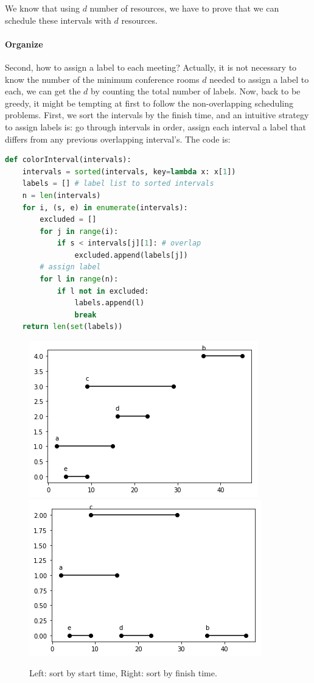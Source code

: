 \documentclass[../main.tex]{subfiles}
\begin{document}
We know that using $d$ number of resources, we have to prove that we can schedule these intervals with $d$ resources. 

\paragraph{Organize}

Second, how to assign a label to each meeting? Actually, it is not necessary to know the number of the minimum conference rooms $d$ needed to assign a label to each, we can get the $d$ by counting the total number of labels. 
Now, back to be greedy, it might be tempting at first to follow the non-overlapping scheduling problems. First, we sort the intervals by the finish time, and an intuitive strategy to assign labels is: go through intervals in order, assign each interval a label that differs from any previous overlapping interval's.  The code is:
\begin{lstlisting}[language=Python]
def colorInterval(intervals):
    intervals = sorted(intervals, key=lambda x: x[1])
    labels = [] # label list to sorted intervals
    n = len(intervals)
    for i, (s, e) in enumerate(intervals):
        excluded = []
        for j in range(i):
            if s < intervals[j][1]: # overlap
                excluded.append(labels[j])
        # assign label
        for l in range(n):
            if l not in excluded: 
                labels.append(l)
                break
    return len(set(labels))
\end{lstlisting}
\begin{figure}[H]
    \centering
    \includegraphics[width=0.48\columnwidth]{fig/greedy_schedule_all_intervals_sorting_finish.png}
        \includegraphics[width=0.48\columnwidth]{fig/greedy_schedule_all_intervals_wrong_sort.png}
    \caption{Left: sort by start time, Right: sort by finish time.}
    \label{fig:greedy_intervals_sorting_bad}
\end{figure}
\end{document}
